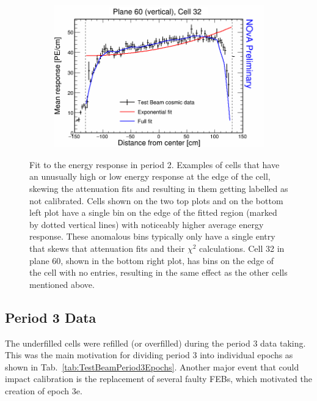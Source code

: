 \begin{figure}[!hbtp]
\begin{subfigure}{0.495\textwidth}
  \end{subfigure}
  \begin{subfigure}{0.495\textwidth}
    \includegraphics[width=\linewidth]{Plots/RelativeCalibrationResults/p2_060_032.png}
  \end{subfigure}
  \caption[Attenuation fits for cells with large fluctuations in period 2 data]{Fit to the energy response in period 2. Examples of cells that have an unusually high or low energy response at the edge of the cell, skewing the attenuation fits and resulting in them getting labelled as not calibrated. Cells shown on the two top plots and on the bottom left plot have a single bin on the edge of the fitted region (marked by dotted vertical lines) with noticeably higher average energy response. These anomalous bins typically only have a single entry that skews that attenuation fits and their $\chi^2$ calculations. Cell 32 in plane 60, shown in the bottom right plot, has bins on the edge of the cell with no entries, resulting in the same effect as the other cells mentioned above.}
  \label{fig:AttenfitResultsPeriod2_CellEdge}
\end{figure}

\subsection{Period 3 Data}\label{sec:TBCalibration_period3}
The underfilled cells were refilled (or overfilled) during the period 3 data taking. This was the main motivation for dividing period 3 into individual epochs as shown in Tab.~\ref{tab:TestBeamPeriod3Epochs}. Another major event that could impact calibration is the replacement of several faulty \glspl{FEB}, which motivated the creation of epoch 3e.

